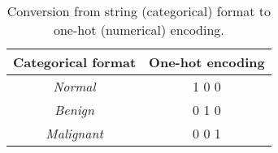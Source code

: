 \begin{table}[h]
\centering
\begin{tabular}{|c|c|}
\hline
\textbf{Categorical format} & \textbf{One-hot encoding} \\ \hline
\textit{Normal}             & 1 0 0            \\ \hline
\textit{Benign}             & 0 1 0            \\ \hline
\textit{Malignant}          & 0 0 1            \\ \hline
\end{tabular}
\caption{Conversion from string (categorical) format to one-hot (numerical) encoding.}
\label{tab:one-hot-encoding-example}
\end{table}